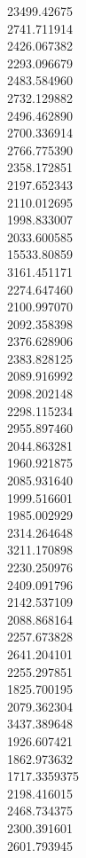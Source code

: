 23499.42675\\
2741.711914\\
2426.067382\\
2293.096679\\
2483.584960\\
2732.129882\\
2496.462890\\
2700.336914\\
2766.775390\\
2358.172851\\
2197.652343\\
2110.012695\\
1998.833007\\
2033.600585\\
15533.80859\\
3161.451171\\
2274.647460\\
2100.997070\\
2092.358398\\
2376.628906\\
2383.828125\\
2089.916992\\
2098.202148\\
2298.115234\\
2955.897460\\
2044.863281\\
1960.921875\\
2085.931640\\
1999.516601\\
1985.002929\\
2314.264648\\
3211.170898\\
2230.250976\\
2409.091796\\
2142.537109\\
2088.868164\\
2257.673828\\
2641.204101\\
2255.297851\\
1825.700195\\
2079.362304\\
3437.389648\\
1926.607421\\
1862.973632\\
1717.3359375\\
2198.416015\\
2468.734375\\
2300.391601\\
2601.793945\\
